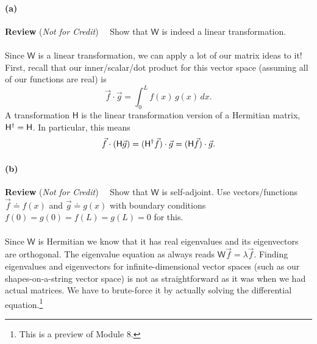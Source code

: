 \documentclass{article}
\def\reviewpart{\textbf{Review} (\emph{Not for Credit})\ \ }				%
\begin{document}
\paragraph{(a)}		\reviewpart
Show that $\mathsf{W}$ is indeed a linear transformation.


\phline
\paragraph{}	
Since $\mathsf{W}$ is a linear transformation, we can apply a lot of our matrix ideas to it!  First, recall that our inner/scalar/dot product for this vector space (assuming
all of our functions are real) is
	\begin{equation*}
		\vec{f}\cdot\vec{g} = \int_{0}^{L}\!f(x)\,g(x)\, dx.
	\end{equation*}
A  transformation $\mathsf{H}$ is the linear transformation version of a Hermitian matrix, $\mathsf{H}^{\dagger}=\mathsf{H}$.  In particular, this means
	\begin{equation*}
		\vec{f}\cdot(\mathsf{H}\vec{g}) = (\mathsf{H}^{\dagger}\vec{f})\cdot\vec{g} = (\mathsf{H}\vec{f})\cdot\vec{g}.
	\end{equation*}

\paragraph{(b)}		\reviewpart
Show that $\mathsf{W}$ is self-adjoint.  Use vectors/functions $\vec{f}\doteq f(x)$ and $\vec{g} \doteq g(x)$ with boundary conditions $f(0)=g(0)=f(L)=g(L) = 0$ for this.



\phline
\paragraph{}
Since $\mathsf{W}$ is Hermitian we know that it has real eigenvalues and its eigenvectors are orthogonal.  The eigenvalue equation as always reads
$\mathsf{W}\vec{f} = \lambda\vec{f}$.  Finding eigenvalues and eigenvectors for infinite-dimensional vector spaces (such as our shapes-on-a-string
vector space) is not as straightforward as it was when we had actual matrices.  We have to brute-force it by actually solving the differential equation.\footnote{This is a preview of Module 8.}


\end{document}
